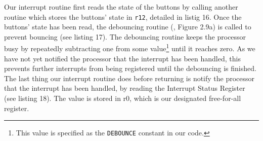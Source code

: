 Our interrupt routine first reads the state of the buttons by calling another routine which stores the buttons' state in \texttt{r12}, detailed in listig 16.
Once the buttons' state has been read, the debouncing routine (\cite{lab-compendium}, Figure 2.9a) is called to prevent bouncing (see listing 17). 
The debouncing routine keeps the processor busy by repeatedly subtracting one from some value\footnote{This value is specified as the \texttt{DEBOUNCE} constant in our code.} until it reaches zero. As we have not yet notified the processor that the interrupt has been handled, this prevents further interrupts from being registered until the debouncing is finished.
The last thing our interrupt routine does before returning is notify the processor that the interrupt has been handled, by reading the Interrupt Status Register (see listing 18).
The value is stored in r0, which is our designated free-for-all register.

